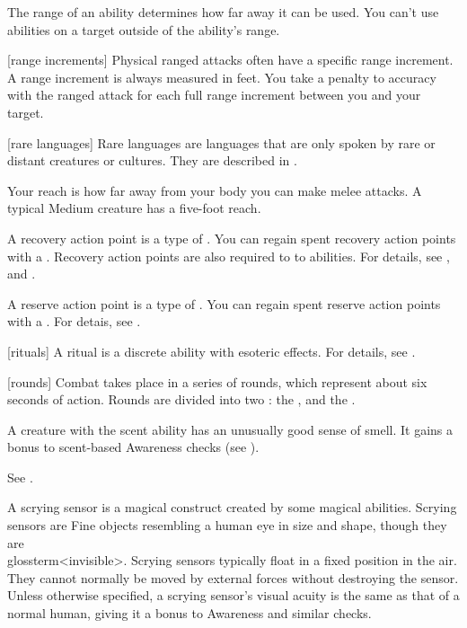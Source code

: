  The range of an ability determines how far away it can be used.
You can't use abilities on a target outside of the ability's range.

[range increments] Physical ranged attacks often have a specific range increment.
A range increment is always measured in feet.
You take a  penalty to accuracy with the ranged attack for each full range increment between you and your target.

[rare languages] Rare languages are languages that are only spoken by rare or distant creatures or cultures.
They are described in .

 Your reach is how far away from your body you can make melee attacks.
A typical Medium creature has a five-foot reach.

 A recovery action point is a type of .
You can regain spent recovery action points with a .
Recovery action points are also required to  to abilities.
For details, see , and .

 A reserve action point is a type of .
You can regain spent reserve action points with a .
For detais, see .

[rituals] A ritual is a discrete  ability with esoteric effects.
For details, see .

[rounds] Combat takes place in a series of rounds, which represent about six seconds of action.
Rounds are divided into two : the , and the .

 A creature with the scent ability has an unusually good sense of smell.
It gains a  bonus to scent-based Awareness checks (see ).

 See .

 A scrying sensor is a magical construct created by some magical abilities.
Scrying sensors are Fine objects resembling a human eye in size and shape, though they are \\glossterm<invisible>.
Scrying sensors typically float in a fixed position in the air.
They cannot normally be moved by external forces without destroying the sensor.
Unless otherwise specified, a scrying sensor's visual acuity is the same as that of a normal human, giving it a  bonus to Awareness and similar checks.

